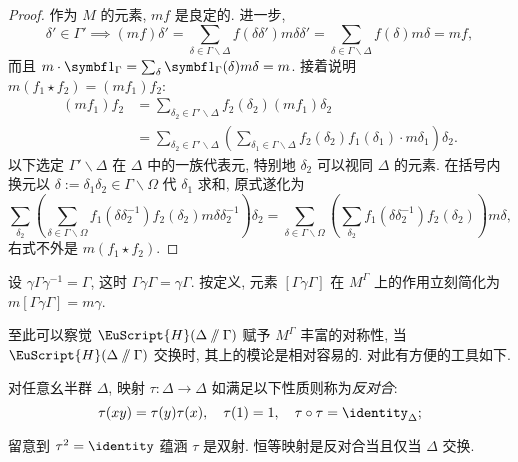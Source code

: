 \begin{proof}
	作为 $M$ 的元素, $mf$ 是良定的. 进一步,
	\[ \delta' \in \Gamma' \implies (mf)\delta' = \sum_{\delta \in \Gamma \backslash \Delta} f(\delta\delta') m\delta\delta' = \sum_{\delta \in \Gamma \backslash \Delta} f(\delta) m\delta = mf, \]
	而且 $m \cdot \charfcn_{\Gamma} = \sum_\delta \charfcn_{\Gamma}(\delta) m\delta = m$. 接着说明 $m(f_1 \star f_2) = (mf_1)f_2$:
	\begin{align*}
		(mf_1) f_2 & = \sum_{\delta_2 \in \Gamma' \backslash \Delta} f_2(\delta_2) (mf_1) \delta_2 \\
		& = \sum_{\delta_2 \in \Gamma' \backslash \Delta} \left( \sum_{\delta_1 \in \Gamma \backslash \Delta} f_2(\delta_2) f_1(\delta_1) \cdot m \delta_1 \right) \delta_2.
	\end{align*}
	以下选定 $\Gamma' \backslash \Delta$ 在 $\Delta$ 中的一族代表元, 特别地 $\delta_2$ 可以视同 $\Delta$ 的元素. 在括号内换元以 $\delta := \delta_1 \delta_2 \in \Gamma \backslash \Omega$ 代 $\delta_1$ 求和, 原式遂化为
	\begin{equation*}
		\sum_{\delta_2} \left( \sum_{\delta \in \Gamma \backslash \Omega} f_1(\delta \delta_2^{-1}) f_2(\delta_2) m \delta \delta_2^{-1} \right) \delta_2
		= \sum_{\delta \in \Gamma \backslash \Omega} \left( \sum_{\delta_2} f_1(\delta \delta_2^{-1}) f_2(\delta_2) \right)  m\delta,
	\end{equation*}
	右式不外是 $m (f_1 \star f_2)$.
\end{proof}

\begin{example}\label{eg:normalizer-action}
	设 $\gamma \Gamma \gamma^{-1} = \Gamma$, 这时 $\Gamma \gamma \Gamma = \gamma \Gamma$. 按定义, 元素 $[\Gamma\gamma\Gamma]$ 在 $M^\Gamma$ 上的作用立刻简化为 $m[\Gamma\gamma\Gamma] = m\gamma$.
\end{example}

至此可以察觉 $\EuScript{H}(\Delta \sslash \Gamma)$ 赋予 $M^\Gamma$ 丰富的对称性, 当 $\EuScript{H}(\Delta \sslash \Gamma)$ 交换时, 其上的模论是相对容易的. 对此有方便的工具如下.

\begin{definition}\label{def:anti-involution} 
	对任意幺半群 $\Delta$, 映射 $\tau: \Delta \to \Delta$ 如满足以下性质则称为\emph{反对合}:
	\[ \tau(xy) = \tau(y)\tau(x), \quad \tau(1)=1, \quad \tau \circ \tau = \identity_\Delta; \]
\end{definition}
留意到 $\tau^2 = \identity$ 蕴涵 $\tau$ 是双射. 恒等映射是反对合当且仅当 $\Delta$ 交换.

